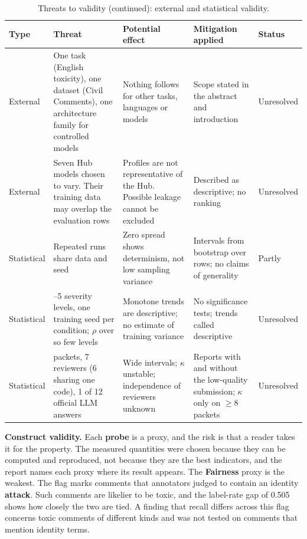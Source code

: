 \begin{table}[!htbp]
\centering\footnotesize\setlength{\tabcolsep}{3pt}
\caption{Threats to validity (continued): external and statistical validity.}\label{tab:threats2}
\begin{tabularx}{\textwidth}{|>{\raggedright\arraybackslash}p{1.6cm}|>{\raggedright\arraybackslash}p{3.5cm}|>{\raggedright\arraybackslash}p{3.3cm}|>{\raggedright\arraybackslash}p{3.2cm}|>{\raggedright\arraybackslash}p{1.5cm}|}
\hline
\textbf{Type} & \textbf{Threat} & \textbf{Potential effect} & \textbf{Mitigation applied} & \textbf{Status}\\
\hline
External & One task (English toxicity), one dataset (Civil Comments), one architecture family for controlled models & Nothing follows for other tasks, languages or models & Scope stated in the abstract and introduction & Unresolved\\ \hline
External & Seven Hub models chosen to vary. Their training data may overlap the evaluation rows & Profiles are not representative of the Hub. Possible leakage cannot be excluded & Described as descriptive; no ranking & Unresolved\\ \hline
Statistical & Repeated runs share data and seed & Zero spread shows determinism, not low sampling variance & Intervals from bootstrap over rows; no claims of generality & Partly\\ \hline
Statistical & 4--5 severity levels, one training seed per condition; $\rho$ over so few levels & Monotone trends are descriptive; no estimate of training variance & No significance tests; trends called descriptive & Unresolved\\ \hline
Statistical & 12 packets, 7 reviewers (6 sharing one code), 1 of 12 official LLM answers & Wide intervals; $\kappa$ unstable; independence of reviewers unknown & Reports with and without the low-quality submission; $\kappa$ only on $\ge8$ packets & Unresolved\\
\hline
\end{tabularx}
\end{table}

\textbf{Construct validity.} Each \textbf{probe} is a proxy, and the risk is that a reader takes it for the property. The measured quantities were chosen because they can be computed and reproduced, not because they are the best indicators, and the report names each proxy where its result appears. The \textbf{Fairness} proxy is the weakest. The flag marks comments that annotators judged to contain an identity \textbf{attack}. Such comments are likelier to be toxic, and the label-rate gap of 0.505 shows how closely the two are tied. A finding that recall differs across this flag concerns toxic comments of different kinds and was not tested on comments that mention identity terms.

